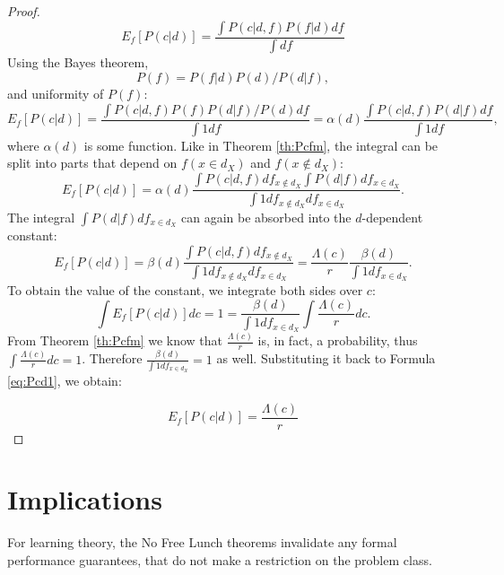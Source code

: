 \documentclass[a4paper]{article}
\begin{document}
\begin{proof}
  \begin{equation}
    E_f\left[P(c|d)\right] = \frac{\int P(c|d,f) P(f|d) df}{\int df}
  \end{equation}
  Using the Bayes theorem,
  \begin{equation}
    P(f) =  P(f|d) P(d) / P(d|f),
  \end{equation}
  and uniformity of $P(f)$:
  \begin{equation}
    E_f\left[P(c|d)\right] = \frac{\int P(c|d,f) P(f) P(d|f) / P(d) df }{\int 1 df} = \alpha(d)
      \frac{\int P(c|d,f) P(d|f) df}{\int 1 df},
  \end{equation}
  where $\alpha(d)$ is some function. Like in Theorem \ref{th:Pcfm},
  the integral can be split into parts that depend on
  $f\left(x\in d_X\right)$ and $f\left(x\notin d_X\right)$:
  \begin{equation}
    E_f\left[P(c|d)\right] = \alpha(d) \frac{\int P\left(c|d,f \right) df_{x\notin d_X}
      \int P\left(d|f\right) df_{x \in d_X}}{\int 1 df_{x\notin d_X} df_{x \in d_X}}.
  \end{equation}
  The integral $\int P\left(d|f\right) df_{x \in d_X}$ can again be
  absorbed into the $d$-dependent constant:
  \begin{equation}
    E_f\left[P(c|d)\right] = \beta(d) \frac{\int P\left(c|d,f \right) df_{x\notin d_X}
    }{\int 1 df_{x\notin d_X} df_{x \in d_X}} = \frac{\Lambda(c)}{r} \frac{\beta(d)}{\int 1 df_{x \in d_X}}.
    \label{eq:Pcd1}
  \end{equation}
  To obtain the value of the constant, we integrate both sides over
  $c$:
  \begin{equation}
    \int E_f\left[P(c|d)\right] dc = 1 = \frac{\beta(d)}{\int 1 df_{x \in d_X}}
    \int \frac{\Lambda(c)}{r} dc.
  \end{equation}
  From Theorem \ref{th:Pcfm} we know that $\frac{\Lambda(c)}{r}$ is,
  in fact, a probability, thus $\int \frac{\Lambda(c)}{r} dc =
  1$. Therefore $\frac{\beta(d)}{\int 1 df_{x \in d_X}} = 1$ as
  well. Substituting it back to Formula \ref{eq:Pcd1}, we obtain:
  
  \begin{equation}
    E_f\left[P(c|d)\right] =  \frac{\Lambda(c)}{r}
  \end{equation}
\end{proof}

\section{Implications}
For learning theory, the No Free Lunch theorems invalidate any formal
performance guarantees, that do not make a restriction on the problem
class.
\end{document}
